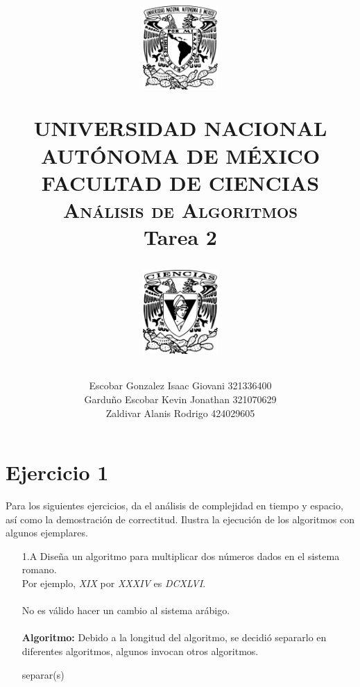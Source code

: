 \documentclass[12pt]{article}
\title{
		\vspace{-0.7in}
		\usefont{OT1}{bch}{b}{n}
		\begin{minipage}{3cm}
        \vspace{-0.5in}
    	\begin{center}
    		\includegraphics[height=3.2cm]{../logo_unam.png}
    	\end{center}
    \end{minipage}\hfill
    \begin{minipage}{10.7cm}

    	\begin{center}
\normalfont \normalsize \textsc{UNIVERSIDAD NACIONAL AUTÓNOMA DE MÉXICO \\ FACULTAD DE CIENCIAS \\ Análisis de Algoritmos } \\
		\huge Tarea 2
    	\end{center}

    \end{minipage}\hfill
    \begin{minipage}{3.2cm}
    \vspace{-0.5in}
    	\begin{center}
    		\includegraphics[height=3.2cm]{../logo_fc.png}
    	\end{center}
    \end{minipage}

\author{Escobar Gonzalez Isaac Giovani \hspace{1cm} 321336400\\
        Garduño Escobar Kevin Jonathan \hspace{0.5cm} 321070629\\
        Zaldivar Alanis Rodrigo \hspace{2.75cm} 424029605 }
\date{}
}
\begin{document}
\maketitle

\section*{Ejercicio 1}
Para los siguientes ejercicios, da el análisis de complejidad en tiempo y espacio, así como la demostración de correctitud. Ilustra la ejecución de los algoritmos con algunos ejemplares.
\begin{itemize}
    \item[1.A] Diseña un algoritmo para multiplicar dos números dados en el sistema romano.\\
    Por ejemplo, \textit{XIX} por \textit{XXXIV} es \textit{DCXLVI}.\\\\
    No es válido hacer un cambio al sistema arábigo.\\\\
    \textbf{Algoritmo:} Debido a la longitud del algoritmo, se decidió separarlo en diferentes algoritmos, algunos invocan otros algoritmos.\\

    \begin{algorithm}[H]
    \footnotesize
    \caption{separar(s)}
    \SetAlgoLined
\end{algorithm}
\end{itemize}
\end{document}
